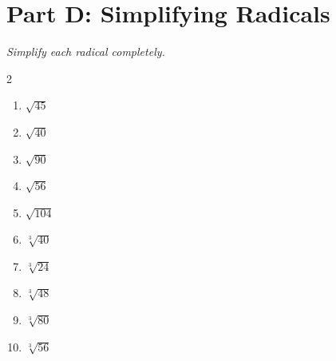 \documentclass[11pt]{article}
\begin{document}
\section*{Part D: Simplifying Radicals}
\noindent\textit{Simplify each radical completely.}
\begin{multicols}{2}
\begin{enumerate}
  \item $\sqrt{45}$
  \vspace{1.1cm}
  \item $\sqrt{40}$
  \vspace{1.1cm}
  \item $\sqrt{90}$
  \vspace{1.1cm}
  \item $\sqrt{56}$
  \vspace{1.1cm}
  \item $\sqrt{104}$
  \vspace{1.1cm}
  \item $\sqrt[3]{40}$
  \vspace{1.1cm}
  \item $\sqrt[3]{24}$
  \vspace{1.1cm}
  \item $\sqrt[3]{48}$
  \vspace{1.1cm}
  \item $\sqrt[3]{80}$
  \vspace{1.1cm}
  \item $\sqrt[3]{56}$
  \vspace{1.1cm}
\end{enumerate}
\end{multicols}
\end{document}
